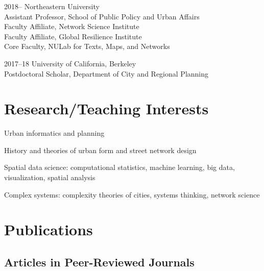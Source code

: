 \documentclass[12pt,letterpaper]{report}
\newcommand{\listitemspace}{0.15em}
\renewenvironment{itemize}
{\begin{list}{}{\setlength{\leftmargin}{0em}
			\setlength{\parskip}{0em}
			\setlength{\itemsep}{\listitemspace}
			\setlength{\parsep}{\listitemspace}}}
	{\end{list}}
\begin{document}
	\begin{tablist}                     
		
		\item[2018--]   \tab Northeastern University \\
		Assistant Professor, School of Public Policy and Urban Affairs \\
		Faculty Affiliate, Network Science Institute \\
		Faculty Affiliate, Global Resilience Institute \\
		Core Faculty, NULab for Texts, Maps, and Networks
		
		
		\item[2017--18] \tab University of California, Berkeley \\
		Postdoctoral Scholar, Department of City and Regional Planning
		
		
	\end{tablist}
	
	
	
	\section*{Research/Teaching Interests}
	
	\begin{itemize}
		
		\item Urban informatics and planning
		
		\item History and theories of urban form and street network design
		
		\item Spatial data science: computational statistics, machine learning, big data, visualization, spatial analysis
		
		\item Complex systems: complexity theories of cities, systems thinking, network science
		
	\end{itemize}
	
	
	
	\section*{Publications}
	
	\subsection*{Articles in Peer-Reviewed Journals}
	
\end{document}
